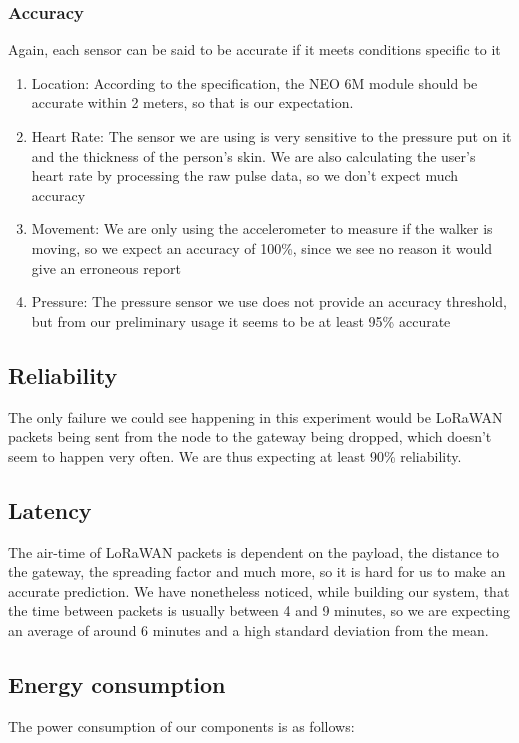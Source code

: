 		\subsubsection{Accuracy}
			Again, each sensor can be said to be accurate if it meets conditions specific to it 

			\begin{enumerate}
				\item Location: According to the specification, the NEO 6M module should be accurate within 2 meters, so that is our expectation.
				\item Heart Rate: The sensor we are using is very sensitive to the pressure put on it and the thickness of the person's skin. We are also calculating the user's heart rate by processing the raw pulse data, so we don't expect much accuracy
				\item Movement: We are only using the accelerometer to measure if the walker is moving, so we expect an accuracy of 100\%, since we see no reason it would give an erroneous report
				\item Pressure: The pressure sensor we use does not provide an accuracy threshold, but from our preliminary usage it seems to be at least 95\% accurate
			\end{enumerate}

		\subsection{Reliability}
			The only failure we could see happening in this experiment would be LoRaWAN packets being sent from the node to the gateway being dropped, which doesn't seem to happen very often. We are thus expecting at least 90\% reliability. 

		\subsection{Latency}
			The air-time of LoRaWAN packets is dependent on the payload, the distance to the gateway, the spreading factor and much more, so it is hard for us to make an accurate prediction. We have nonetheless noticed, while building our system, that the time between packets is usually between 4 and 9 minutes, so we are expecting an average of around 6 minutes and a high standard deviation from the mean.
		\newline
		\newline
		\newline
		\subsection{Energy consumption}
			The power consumption of our components is as follows:


